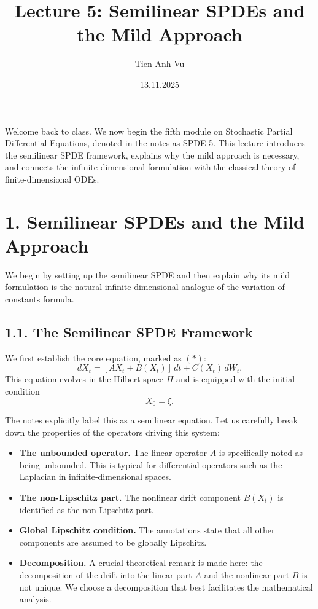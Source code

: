 \documentclass[11pt]{article}
\title{Lecture 5: Semilinear SPDEs and the Mild Approach}
\date{13.11.2025}
\author{Tien Anh Vu}
\theoremstyle{definition}
\theoremstyle{remark}
\begin{document}
\maketitle

Welcome back to class. We now begin the fifth module on Stochastic Partial Differential Equations, denoted in the notes as SPDE 5. This lecture introduces the semilinear SPDE framework, explains why the mild approach is necessary, and connects the infinite-dimensional formulation with the classical theory of finite-dimensional ODEs.

\section*{1. Semilinear SPDEs and the Mild Approach}
We begin by setting up the semilinear SPDE and then explain why its mild formulation is the natural infinite-dimensional analogue of the variation of constants formula.

\subsection*{1.1. The Semilinear SPDE Framework}
We first establish the core equation, marked as \((*)\):
\[
dX_t=[AX_t+B(X_t)]\,dt+C(X_t)\,dW_t.
\]
This equation evolves in the Hilbert space \(H\) and is equipped with the initial condition
\[
X_0=\xi.
\]

The notes explicitly label this as a semilinear equation. Let us carefully break down the properties of the operators driving this system:
\begin{itemize}
\item \textbf{The unbounded operator.} The linear operator \(A\) is specifically noted as being unbounded. This is typical for differential operators such as the Laplacian in infinite-dimensional spaces.
\item \textbf{The non-Lipschitz part.} The nonlinear drift component \(B(X_t)\) is identified as the non-Lipschitz part.
\item \textbf{Global Lipschitz condition.} The annotations state that all other components are assumed to be globally Lipschitz.
\item \textbf{Decomposition.} A crucial theoretical remark is made here: the decomposition of the drift into the linear part \(A\) and the nonlinear part \(B\) is not unique. We choose a decomposition that best facilitates the mathematical analysis.
\end{itemize}
\end{document}
